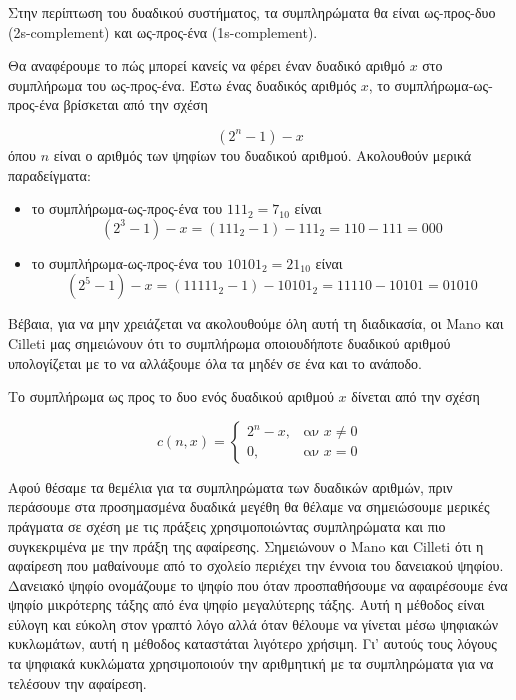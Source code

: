 Στην περίπτωση του δυαδικού συστήματος, τα συμπληρώματα θα είναι ως-προς-δυο (2s-complement) και ως-προς-ένα (1s-complement).

Θα αναφέρουμε το πώς μπορεί κανείς να φέρει έναν δυαδικό αριθμό $x$ στο συμπλήρωμα του ως-προς-ένα. Έστω ένας δυαδικός αριθμός $x$, το
συμπλήρωμα-ως-προς-ένα βρίσκεται από την σχέση

\begin{equation}
    (2^n - 1) - x
\end{equation}
όπου $n$ είναι ο αριθμός των ψηφίων του  δυαδικού αριθμού. Ακολουθούν μερικά παραδείγματα:

\begin{itemize}
    \item το συμπλήρωμα-ως-προς-ένα του $111_2 = 7_{10}$ είναι
    \begin{equation}
        (2^3 - 1) - x = (111_2 - 1) - 111_2 = 110 - 111 = 000
    \end{equation}
    \item το συμπλήρωμα-ως-προς-ένα του $10101_2 = 21_{10}$ είναι
    \begin{equation}
        (2^5 - 1) - x = (11111_2 - 1) - 10101_2 = 11110 - 10101 = 01010
    \end{equation}
\end{itemize}

Βέβαια, για να μην χρειάζεται να ακολουθούμε όλη αυτή τη διαδικασία, οι Mano και Cilleti \cite{ManoCilleti2018} μας σημειώνουν ότι
το συμπλήρωμα οποιουδήποτε δυαδικού αριθμού υπολογίζεται με το να αλλάξουμε όλα τα μηδέν σε ένα και το ανάποδο.

Το συμπλήρωμα ως προς το δυο ενός δυαδικού αριθμού $x$ δίνεται από την σχέση

\begin{equation}
    c(n, x) =
    \begin{cases}
        2^n - x, & \text{αν } x \neq 0\\
        0,& \text{αν } x = 0
    \end{cases}
\end{equation}

Αφού θέσαμε τα θεμέλια για τα συμπληρώματα των δυαδικών αριθμών, πριν περάσουμε στα προσημασμένα δυαδικά μεγέθη θα θέλαμε να σημειώσουμε
μερικές πράγματα σε σχέση με τις πράξεις χρησιμοποιώντας συμπληρώματα και πιο συγκεκριμένα με την πράξη της αφαίρεσης. Σημειώνουν ο Mano και
Cilleti \cite{ManoCilleti2018} ότι η αφαίρεση που μαθαίνουμε από το σχολείο περιέχει την έννοια του δανειακού ψηφίου. Δανειακό ψηφίο ονομάζουμε
το ψηφίο που  όταν προσπαθήσουμε να αφαιρέσουμε ένα ψηφίο μικρότερης τάξης από ένα ψηφίο μεγαλύτερης τάξης. Αυτή η μέθοδος
είναι εύλογη και εύκολη στον γραπτό λόγο αλλά όταν θέλουμε να γίνεται μέσω ψηφιακών κυκλωμάτων, αυτή η μέθοδος καταστάται λιγότερο χρήσιμη.
Γι' αυτούς τους λόγους τα ψηφιακά κυκλώματα χρησιμοποιούν την αριθμητική με τα συμπληρώματα για να τελέσουν την αφαίρεση.

